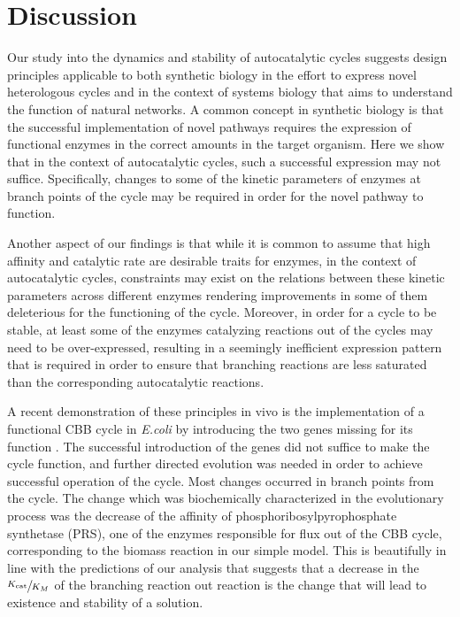 \section{Discussion}
Our study into the dynamics and stability of autocatalytic cycles suggests design principles applicable to both synthetic biology in the effort to express novel heterologous cycles and in the context of systems biology that aims to understand the function of natural networks.
A common concept in synthetic biology is that the successful implementation of novel pathways requires the expression of functional enzymes in the correct amounts in the target organism.
Here we show that in the context of autocatalytic cycles, such a successful expression may not suffice.
Specifically, changes to some of the kinetic parameters of enzymes at branch points of the cycle may be required in order for the novel pathway to function.

Another aspect of our findings is that while it is common to assume that high affinity and catalytic rate are desirable traits for enzymes, in the context of autocatalytic cycles, constraints may exist on the relations between these kinetic parameters across different enzymes rendering improvements in some of them deleterious for the functioning of the cycle.
Moreover, in order for a cycle to be stable, at least some of the enzymes catalyzing reactions out of the cycles may need to be over-expressed, resulting in a seemingly inefficient expression pattern that is required in order to ensure that branching reactions are less saturated than the corresponding autocatalytic reactions.

A recent demonstration of these principles in vivo is the implementation of a functional CBB cycle in \emph{E.coli} by introducing the two genes missing for its function \cite{Antonovski2016}.
The successful introduction of the genes did not suffice to make the cycle function, and further directed evolution was needed in order to achieve successful operation of the cycle.
Most changes occurred in branch points from the cycle.
The change which was biochemically characterized in the evolutionary process was the decrease of the affinity of phosphoribosylpyrophosphate synthetase (PRS), one of the enzymes responsible for flux out of the CBB cycle, corresponding to the biomass reaction in our simple model.
This is beautifully in line with the predictions of our analysis that suggests that a decrease in the $\sfrac{K_{\text{cat}}}{K_M}$ of the branching reaction out reaction is the change that will lead to existence and stability of a solution.

